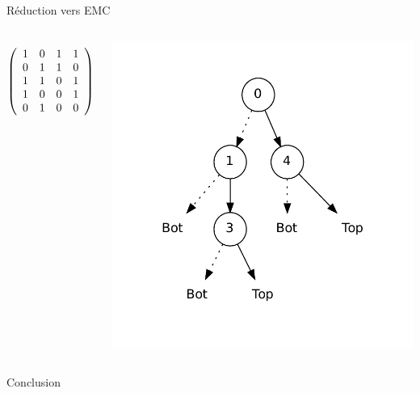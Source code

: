 \documentclass{beamer}
\begin{document}
\begin{frame}{Réduction vers EMC}
  \begin{columns}

  \begin{displaymath}
   \left(\begin{array}{ c c c c c }
   1 & 0 & 1 & 1 \\
   0 & 1 & 1 & 0 \\
   1 & 1 & 0 & 1 \\
   1 & 0 & 0 & 1 \\
   0 & 1 & 0 & 0
  \end{array}\right)
  \end{displaymath}

    \includegraphics[height=0.8\textheight]{../inter.pdf}
  \end{columns}
\end{frame}



\begin{frame}{}

\end{frame}

\begin{frame}{}

\end{frame}

\begin{frame}{}

\end{frame}

\begin{frame}{}

\end{frame}

\begin{frame}{}

\end{frame}


\begin{frame}{Conclusion}
  
\end{frame}
\end{document}
